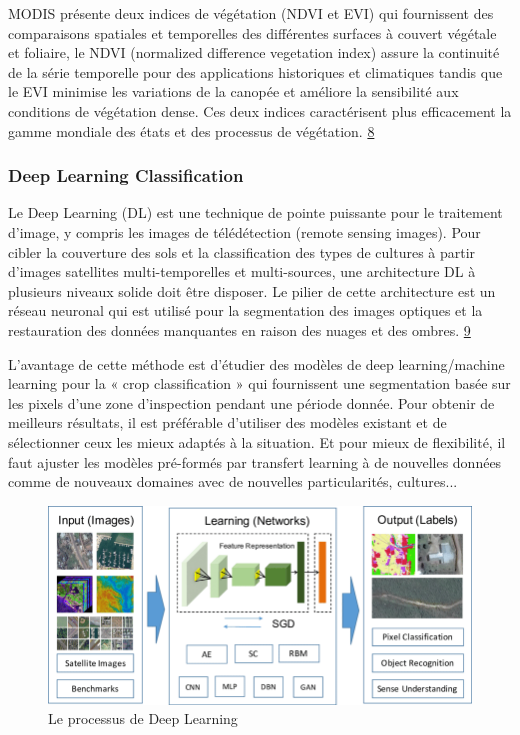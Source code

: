 \documentclass[12pt, openany]{report}
\begin{document}
MODIS présente deux indices de végétation (NDVI et EVI) qui fournissent des comparaisons spatiales et temporelles des différentes surfaces à couvert végétale et foliaire, le NDVI (normalized difference vegetation index) assure la continuité de la série temporelle pour des applications historiques et climatiques tandis que le EVI minimise les variations de la canopée et améliore la sensibilité aux conditions de végétation dense.
Ces deux indices caractérisent plus efficacement la gamme mondiale des états et des processus de végétation. \hyperref[sec:refs]{8}


\subsubsection{Deep Learning Classification}
Le Deep Learning (DL) est une technique de pointe puissante pour le traitement d'image, y compris les images de télédétection (remote sensing images). 
Pour cibler la couverture des sols et la classification des types de cultures à partir d'images satellites multi-temporelles et multi-sources, une architecture DL à plusieurs niveaux solide doit être disposer. 
Le pilier de cette architecture est un réseau neuronal qui est utilisé pour la segmentation des images optiques et la restauration des données manquantes en raison des nuages et des ombres. \hyperref[sec:refs]{9} 

L’avantage de cette méthode est d’étudier des modèles de deep learning/machine learning pour la « crop classification » qui fournissent une segmentation basée sur les pixels d'une zone d'inspection pendant une période donnée. Pour obtenir de meilleurs résultats, il est préférable d’utiliser des modèles existant et de sélectionner ceux les mieux adaptés à la situation. Et pour mieux de flexibilité, il faut ajuster les modèles pré-formés par transfert learning à de nouvelles données comme de nouveaux domaines avec de nouvelles particularités, cultures...

\begin{figure}[hp]
\centering
\includegraphics[scale=0.5]{deep.png}
\caption{Le processus de Deep Learning}
\end{figure}
\end{document}
